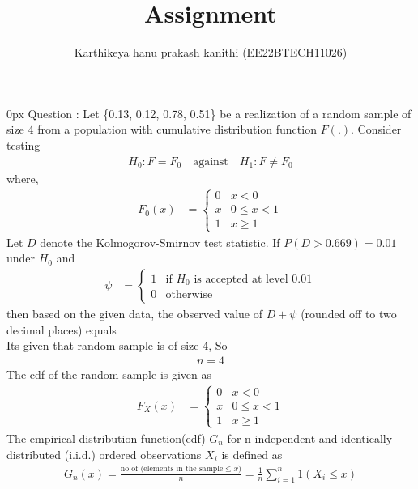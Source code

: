 \documentclass[article]{IEEEtran}
\theoremstyle{remark}
\begin{document}
\let\vec\mathbf


\title{
Assignment
}
\author{ Karthikeya hanu prakash kanithi (EE22BTECH11026)}
\maketitle
\parindent0px
\vspace{3cm}
Question : Let \{0.13, 0.12, 0.78, 0.51\} be a realization of a random sample of size 4 from a population with cumulative distribution function $F(.)$. Consider testing
\begin{align}
H_0 : F = F_0 \quad \text{against} \quad H_1 : F \ne F_0
\end{align}
where,
\begin{align}
    F_0(x) &= 
    \begin{cases}
        0 &  x<0  \\
        x & 0\le x<1 \\
        1 & x\ge 1
    \end{cases}
\end{align}
Let $D$ denote the Kolmogorov-Smirnov test statistic. If $P (D > 0.669) = 0.01$ under $H_0$ and
\begin{align}
    \psi &= 
    \begin{cases}
        1 &  \text{if } H_0 \text{ is accepted at level } 0.01 \\
        0 &  \text{otherwise} 
    \end{cases} 
\end{align}
then based on the given data, the observed value of $D + \psi$ (rounded off to two decimal places) equals
\\\solution 
Its given that random sample is of size 4, So 
\begin{align}
	n=4 \label{eq:st/65/1}
\end{align}
The cdf of the random sample is given as 
\begin{align}
    F_X(x) &= 
    \begin{cases}
        0 &  x<0  \\
        x & 0\le x<1 \\
        1 & x\ge 1
    \end{cases} \label{eq:st/65/2}
\end{align}
The empirical distribution function(edf) $G_n$ for n independent and identically distributed (i.i.d.) ordered observations $X_i$ is defined as
\begin{align}
	G_n(x) = \frac{\text{no of (elements in the sample} \le x)}{n} = \frac{1}{n} \sum_{i=1}^{n} 1(X_i \le x)  \label{eq:st/65/3}
\end{align}
\end{document}
